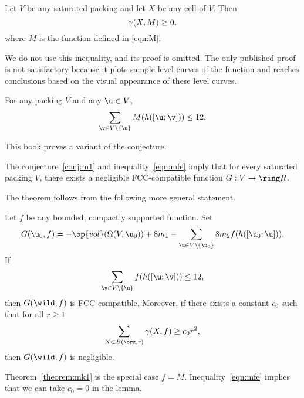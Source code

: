 \begin{cnl}
\begin{theorem*}[]
\label{lemma:MI} 
%
Let $V$ be any saturated packing and let $X$ be any cell of $V$.  Then
\begin{equation}\label{eqn:mfe} 
\gamma(X,M)\ge 0,
\end{equation}
where $M$ is the function defined in \eqref{eqn:M}.
\end{theorem*}

\begin{remark}  %
  We do not use this inequality, and its proof is omitted.  
  The only published proof~\cite{marchal:2009} is not satisfactory because
  it plots sample level curves of the function and reaches conclusions
  based on the visual appearance of these level curves.
\end{remark}

\begin{conjecture}[Marchal]
\label{conj:m1} 
%
For any packing $ V$ and any $ \u\in V$,
\[  
\sumfinitepred{\v}{\v\in V\setminus\braced{\u}} {M(h([\u;\v]))} \le 12.
\] 
\end{conjecture}

This book proves a variant of the conjecture.


\begin{theorem}
\label{theorem:mk1} 
%
The conjecture~\eqref{conj:m1} and inequality~\eqref{eqn:mfe} imply
that for every saturated packing $V$, there exists a negligible
FCC-compatible function $G:V\to \Real$.
\end{theorem}

The theorem follows from the following more general statement.

\begin{lemma}
\label{lemma:mk1}
%
Let $f$ be any bounded, compactly supported function.  Set
\[
G( \u_0,f) = -\op{vol}(\Omega(V, \u_0)) + 8
m_1 - \sumfinitepred{\u}{\u\in V\setminus\braced{\u_0}} {8 m_2 f(h([\u_0;\u]))}.
\]
If
\[  
\sumfinitepred{\v}{\v\in V\setminus\braced{\u}}{f(h([\u;\v]))} \le 12,
\] 
then $G(\wild,f)$ is FCC-compatible.
Moreover, if there exists a constant $c_0$ such
that for all  $r\ge1$
\[
\sumfinitepred{X}{X\subset \openBall{\orz}{r}}{ \gammaX(X,f) \ge c_0 r^2},
\]
then $G(\wild,f)$ is negligible.
\end{lemma}

Theorem~\ref{theorem:mk1} is the special case $f=M$.  
Inequality~\ref{eqn:mfe} implies that we can take $c_0=0$ in the
lemma.


\end{cnl}
